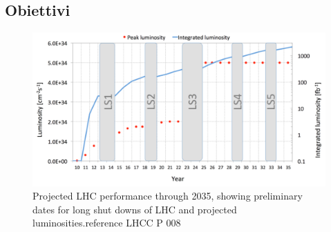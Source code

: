 \subsection{Obiettivi}
\begin{figure}
\centering
\includegraphics[scale=.35]{Immagini/HL-LHC}
\caption{Projected LHC performance through 2035, showing preliminary dates for long shut downs of LHC and projected luminosities.reference LHCC P 008}
\label{HL-LHC}
\end{figure}

